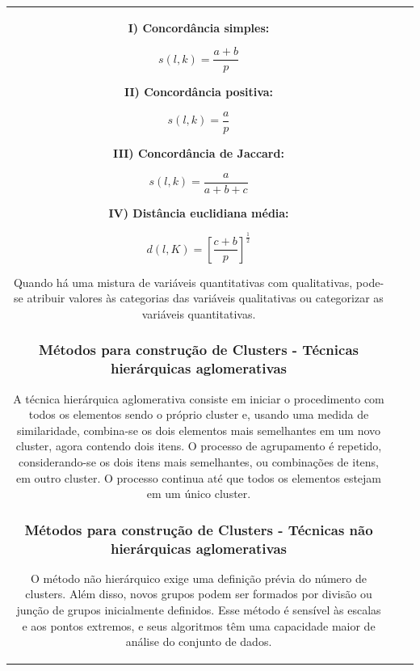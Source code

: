 \documentclass[
]{estat/estat}
\begin{document}
\begin{tabular}{c|cc}
\textbf{I) Concordância simples:}

\[
s(l,k) = \frac{a+b}{p}
\]

\textbf{II) Concordância positiva:}

\[
s(l,k) = \frac{a}{p}
\]

\textbf{III) Concordância de Jaccard:}

\[
s(l,k) = \frac{a}{a+b+c}
\]

\textbf{IV) Distância euclidiana média:}

\[
d(l,K) = \left[ \frac{c+b}{p} \right]^{\frac{1}{2}}
\]

Quando há uma mistura de variáveis quantitativas com qualitativas,
pode-se atribuir valores às categorias das variáveis qualitativas ou
categorizar as variáveis quantitativas.

\hypertarget{muxe9todos-para-construuxe7uxe3o-de-clusters---tuxe9cnicas-hieruxe1rquicas-aglomerativas}{%
\subsubsection{Métodos para construção de Clusters - Técnicas
hierárquicas
aglomerativas}\label{muxe9todos-para-construuxe7uxe3o-de-clusters---tuxe9cnicas-hieruxe1rquicas-aglomerativas}}

A técnica hierárquica aglomerativa consiste em iniciar o procedimento
com todos os elementos sendo o próprio cluster e, usando uma medida de
similaridade, combina-se os dois elementos mais semelhantes em um novo
cluster, agora contendo dois itens. O processo de agrupamento é
repetido, considerando-se os dois itens mais semelhantes, ou combinações
de itens, em outro cluster. O processo continua até que todos os
elementos estejam em um único cluster.

\hypertarget{muxe9todos-para-construuxe7uxe3o-de-clusters---tuxe9cnicas-nuxe3o-hieruxe1rquicas-aglomerativas}{%
\subsubsection{Métodos para construção de Clusters - Técnicas não
hierárquicas
aglomerativas}\label{muxe9todos-para-construuxe7uxe3o-de-clusters---tuxe9cnicas-nuxe3o-hieruxe1rquicas-aglomerativas}}

O método não hierárquico exige uma definição prévia do número de
clusters. Além disso, novos grupos podem ser formados por divisão ou
junção de grupos inicialmente definidos. Esse método é sensível às
escalas e aos pontos extremos, e seus algoritmos têm uma capacidade
maior de análise do conjunto de dados.


\end{tabular}
\end{document}
